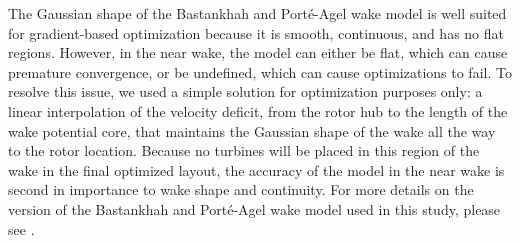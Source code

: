 \documentclass[a4paper]{jpconf}
\begin{document}
%
%

The Gaussian shape of the Bastankhah and Port\'e-Agel wake model is well suited for gradient-based optimization because it is smooth, continuous, and has no flat regions. However, in the near wake, the model can either be flat, which can cause premature convergence, or be undefined, which can cause optimizations to fail. To resolve this issue, we used a simple solution for optimization purposes only: a linear interpolation of the velocity deficit, from the rotor hub to the length of the wake potential core, that maintains the Gaussian shape of the wake all the way to the rotor location. Because no turbines will be placed in this region of the wake in the final optimized layout, the accuracy of the model in the near wake is second in importance to wake shape and continuity. For more details on the version of the Bastankhah and Port\'e-Agel wake model used in this study, please see \cite{thomas2019-les-validation}.
\end{document}

